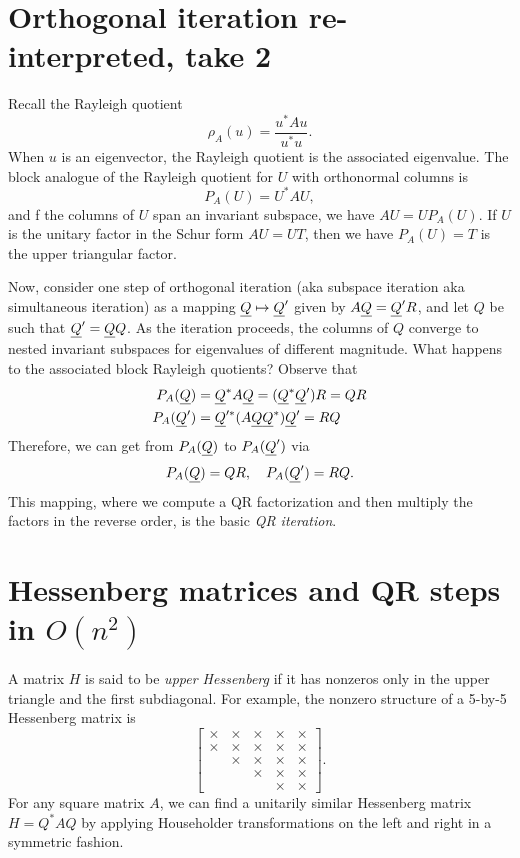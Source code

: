 \documentclass[12pt, leqno]{article} %
\begin{document}
\section{Orthogonal iteration re-interpreted, take 2}

Recall the Rayleigh quotient
\[
  \rho_A(u) = \frac{u^* A u}{u^* u}.
\]
When $u$ is an eigenvector, the Rayleigh quotient is the associated
eigenvalue.  The block analogue of the Rayleigh quotient for $U$ with
orthonormal columns is
\[
  P_A(U) = U^* A U,
\]
and f the columns of $U$ span an invariant subspace, we have
$AU = U P_A(U)$.  If $U$ is the unitary factor in the Schur form
$AU = UT$, then we have $P_A(U) = T$ is the upper triangular factor.

Now, consider one step of orthogonal iteration (aka subspace iteration
aka simultaneous iteration) as a mapping
$\underline{Q} \mapsto \underline{Q}'$ given by $A\underline{Q} = \underline{Q}' R$, and let $Q$ be such that
$\underline{Q}' = \underline{Q} Q$.  As the iteration proceeds, the
columns of $Q$ converge to nested invariant subspaces for eigenvalues
of different magnitude.  What happens to the associated block Rayleigh
quotients?  Observe that
\begin{align*}
  P_A(\underline{Q}) &= \underline{Q}^* A \underline{Q} = (\underline{Q}^* \underline{Q}') R  = QR\\
  P_A(\underline{Q}') &= \underline{Q}'^* (A\underline{Q} \underline{Q}^*) \underline{Q}' = RQ
\end{align*}
Therefore, we can get from $P_A(\underline{Q})$ to $P_A(\underline{Q}')$ via
\[
  P_A(\underline{Q}) = Q R, \quad P_A(\underline{Q}') = R Q.
\]
This mapping, where we compute a QR factorization and then multiply
the factors in the reverse order, is the basic {\em QR iteration}.

\section{Hessenberg matrices and QR steps in $O(n^2)$}

A matrix $H$ is said to be {\em upper Hessenberg} if it has
nonzeros only in the upper triangle and the first subdiagonal.
For example, the nonzero structure of a 5-by-5 Hessenberg matrix
is
\[
  \begin{bmatrix}
    \times & \times & \times & \times & \times \\
    \times & \times & \times & \times & \times \\
           & \times & \times & \times & \times \\
           &        & \times & \times & \times \\
           &        &        & \times & \times
  \end{bmatrix}.
\]
For any square matrix $A$, we can find a unitarily similar Hessenberg
matrix $H = Q^* A Q$ by applying Householder transformations on the
left and right in a symmetric fashion.
\end{document}

